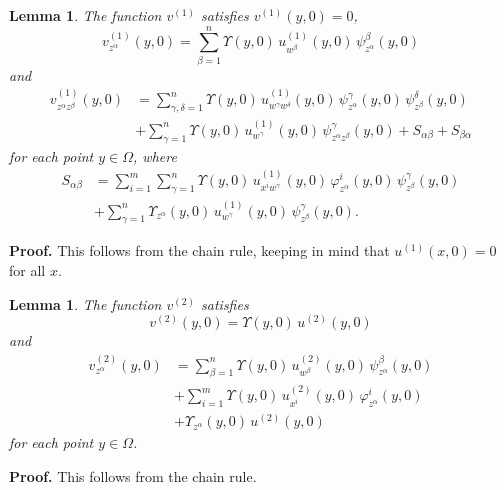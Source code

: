 \documentclass[11pt]{amsart}
\newtheorem{lemma}[theorem]{Lemma}
\theoremstyle{definition}
\begin{document}
\begin{lemma}
\label{v1}
The function $v^{(1)}$ satisfies $v^{(1)}(y,0) = 0$, 
\[v^{(1)}_{z^\alpha}(y,0) = \sum_{\beta=1}^n \Upsilon(y,0) \, u^{(1)}_{w^\beta}(y,0) \, \psi^\beta_{z^\alpha}(y,0)\] 
and 
\begin{align*} 
v^{(1)}_{z^\alpha z^\beta}(y,0) 
&= \sum_{\gamma,\delta=1}^n \Upsilon(y,0) \, u^{(1)}_{w^\gamma w^\delta}(y,0) \, \psi^\gamma_{z^\alpha}(y,0) \, \psi^\delta_{z^\beta}(y,0) \\ 
&+ \sum_{\gamma=1}^n \Upsilon(y,0) \, u^{(1)}_{w^\gamma}(y,0) \, \psi^\gamma_{z^\alpha z^\beta}(y,0) + S_{\alpha\beta} + S_{\beta\alpha} 
\end{align*}
for each point $y \in \Omega$, where 
\begin{align*} 
S_{\alpha\beta} 
&= \sum_{i=1}^m \sum_{\gamma=1}^n \Upsilon(y,0) \, u^{(1)}_{x^i w^\gamma}(y,0) \, \varphi^i_{z^\alpha}(y,0) \, \psi^\gamma_{z^\beta}(y,0) \\ 
&+ \sum_{\gamma=1}^n \Upsilon_{z^\alpha}(y,0) \, u^{(1)}_{w^\gamma}(y,0) \, \psi^\gamma_{z^\beta}(y,0). 
\end{align*}
\end{lemma}

\textbf{Proof.} 
This follows from the chain rule, keeping in mind that $u^{(1)}(x,0) = 0$ for all $x$. \\

\begin{lemma}
\label{v2}
The function $v^{(2)}$ satisfies 
\[v^{(2)}(y,0) = \Upsilon(y,0) \, u^{(2)}(y,0)\] 
and 
\begin{align*} 
v^{(2)}_{z^\alpha}(y,0) 
&= \sum_{\beta=1}^n \Upsilon(y,0) \, u^{(2)}_{w^\beta}(y,0) \, \psi^\beta_{z^\alpha}(y,0) \\ 
&+ \sum_{i=1}^m \Upsilon(y,0) \, u^{(2)}_{x^i}(y,0) \, \varphi^i_{z^\alpha}(y,0) \\ 
&+ \Upsilon_{z^\alpha}(y,0) \, u^{(2)}(y,0) 
\end{align*}
for each point $y \in \Omega$.
\end{lemma}

\textbf{Proof.}
This follows from the chain rule. \\
\end{document}
